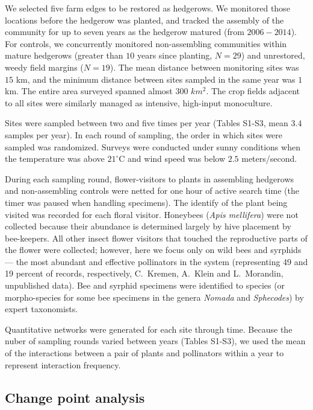 \documentclass[12pt]{article}
\begin{document}
We selected five farm edges to be restored as hedgerows. We monitored
those locations before the hedgerow was planted, and tracked the
assembly of the community for up to seven years as the hedgerow
matured (from $2006-2014$). For controls, we concurrently monitored
non-assembling communities within mature hedgerows (greater than $10$
years since planting, $N=29$) and unrestored, weedy field margins
($N=19$). The mean distance between monitoring sites was $15$ km, and
the minimum distance between sites sampled in the same year was $1$
km. The entire area surveyed spanned almost $300$ $km^2$. The crop
fields adjacent to all sites were similarly managed as intensive,
high-input monoculture.

Sites were sampled between two and five times per year (Tables S1-S3,
mean $3.4$ samples per year). In each round of sampling, the order in
which sites were sampled was randomized. Surveys were conducted under
sunny conditions when the temperature was above $21^{\circ}\mathrm{C}$
and wind speed was below $2.5$ meters/second.

During each sampling round, flower-visitors to plants in assembling
hedgerows and non-assembling controls were netted for one hour of
active search time (the timer was paused when handling specimens). The
identify of the plant being visited was recorded for each floral
visitor. Honeybees (\textit{Apis mellifera}) were not collected
because their abundance is determined largely by hive placement by
bee-keepers. All other insect flower visitors that touched the
reproductive parts of the flower were collected; however, here we
focus only on wild bees and syrphids --- the most abundant and
effective pollinators in the system (representing 49 and 19 percent of
records, respectively, C.~Kremen, A.~Klein and L.~Morandin,
unpublished data). Bee and syrphid specimens were identified to
species (or morpho-species for some bee specimens in the genera
\textit{Nomada} and \textit{Sphecodes}) by expert taxonomists.

Quantitative networks were generated for each site through
time. Because the nuber of sampling rounds varied between years
(Tables S1-S3), we used the mean of the interactions between a pair of
plants and pollinators within a year to represent interaction
frequency.

\subsection*{Change point analysis}
\end{document}
